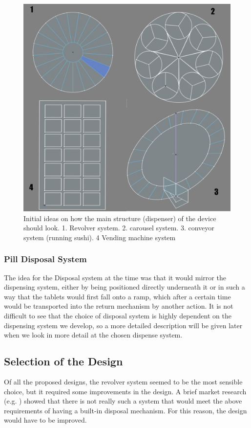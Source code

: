 \begin{figure}[h]
	\centering
	\includegraphics[width=0.7\linewidth]{Figures/Designs.png} 
	\caption[Early drafts]{Initial ideas on how the main structure (dispenser) of the device should look. 1. Revolver system. 2. carousel system. 3. conveyor system (running sushi). 4 Vending machine system}
	\label{fig:designs}
\end{figure}
\subsubsection{Pill Disposal System}
The idea for the Disposal system at the time was that it would mirror the dispensing system, either by being positioned directly underneath it or in such a way that the tablets would first fall onto a ramp, which after a certain time would be transported into the return mechanism by another action. It is not difficult to see that the choice of disposal system is highly dependent on the dispensing system we develop, so a more detailed description will be given later when we look in more detail at the chosen dispense system.

\newpage
\subsection{Selection of the Design}
Of all the proposed designs, the revolver system seemed to be the most sensible choice, but it required some improvements in the design. A brief market research (e.g. \cite{LiveFinePillDispenser} \cite{zoksi_pill_organizer}) showed that there is not really such a system that would meet the above requirements of having a built-in disposal mechanism. For this reason, the design would have to be improved.

